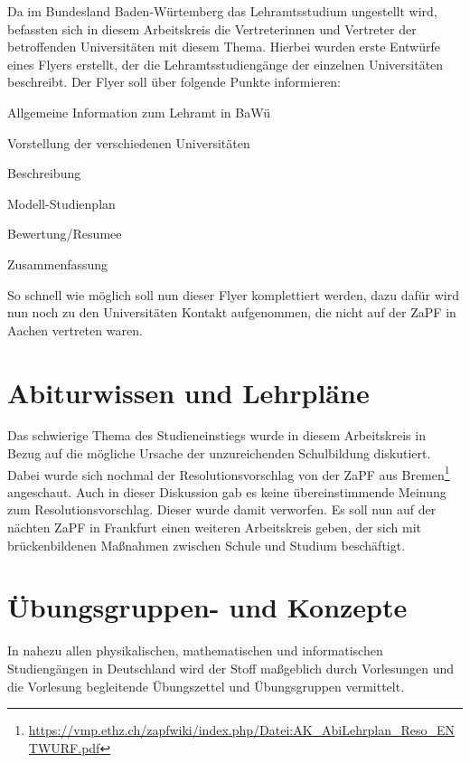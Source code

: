 \documentclass{scrartcl}
\begin{document}
Da im Bundesland Baden-Würtemberg das Lehramtsstudium ungestellt wird,
befassten sich in diesem Arbeitskreis die Vertreterinnen und Vertreter der
betroffenden Universitäten mit diesem Thema. Hierbei wurden erste Entwürfe
eines Flyers erstellt, der die Lehramtsstudiengänge der einzelnen Universitäten
beschreibt. Der Flyer soll über folgende Punkte informieren:

\begin{compactenum}
	\item Allgemeine Information zum Lehramt in BaWü
	\item Vorstellung der verschiedenen Universitäten
		\begin{compactenum}
		\item Beschreibung
		\item Modell-Studienplan
		\item Bewertung/Resumee
		\end{compactenum}
	\item Zusammenfassung
\end{compactenum}

So schnell wie möglich soll nun dieser Flyer komplettiert werden, dazu dafür
wird nun noch zu den Universitäten Kontakt aufgenommen, die nicht auf der
ZaPF in Aachen vertreten waren.

\section*{Abiturwissen und Lehrpläne}

Das schwierige Thema des Studieneinstiegs wurde in diesem Arbeitskreis in Bezug
auf die mögliche Ursache der unzureichenden Schulbildung diskutiert.  Dabei
wurde sich nochmal der Resolutionsvorschlag von der ZaPF aus Bremen\footnote{\href{https://vmp.ethz.ch/zapfwiki/index.php/Datei:AK_AbiLehrplan_Reso_ENTWURF.pdf}{\url{https://vmp.ethz.ch/zapfwiki/index.php/Datei:AK_AbiLehrplan_Reso_ENTWURF.pdf}}}
angeschaut. Auch in dieser Diskussion gab es keine übereinstimmende Meinung zum
Resolutionsvorschlag. Dieser wurde damit verworfen.  Es soll nun auf der
nächten ZaPF in Frankfurt einen weiteren Arbeitskreis geben, der sich mit
brückenbildenen Maßnahmen zwischen Schule und Studium beschäftigt.

\section*{Übungsgruppen- und Konzepte}
In nahezu allen physikalischen, mathematischen und informatischen Studiengängen
in Deutschland wird der Stoff maßgeblich durch Vorlesungen und die Vorlesung
begleitende Übungszettel und Übungsgruppen vermittelt.
\end{document}
